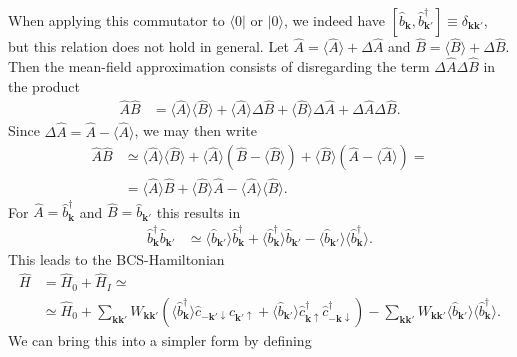 \documentclass[english, parskip=full]{scrartcl}
\renewcommand{\bra}{}
\newcommand{\kla}{}
\newcommand{\Bra}{}
\newcommand{\Ket}{}
\begin{document}
When applying this commutator to $\Bra\langle 0 |$ or $\Ket | 0 \rangle$, we indeed have $\left[ \hat{b}_{\mathbf{k}}, \hat{b}_{\mathbf{k}'}^\dagger \right] \equiv  \delta_{\mathbf{k}\mathbf{k}'}$, but this relation does not hold in general.
Let $\hat{A} = \bra\langle \hat{A} \rangle + \Delta\hat{A}$ and $\hat{B} = \bra\langle \hat{B} \rangle + \Delta\hat{B}$. 
Then the mean-field approximation consists of disregarding the term $\Delta\hat{A}\Delta\hat{B}$ in the product
\begin{align}
\hat{A}\hat{B} &= \bra\langle \hat{A} \rangle\bra\langle \hat{B} \rangle + \bra\langle \hat{A} \rangle\Delta\hat{B} + \bra\langle \hat{B} \rangle\Delta\hat{A} + \Delta\hat{A}\Delta\hat{B}.
\end{align}
Since $\Delta\hat{A} = \hat{A} - \bra\langle \hat{A} \rangle$, we may then write
\begin{align}
\hat{A}\hat{B} &\simeq \bra\langle \hat{A} \rangle\bra\langle \hat{B} \rangle + \bra\langle \hat{A} \rangle \kla\left( \hat{B} - \bra\langle \hat{B} \rangle \right) + \bra\langle \hat{B} \rangle\kla\left( \hat{A} - \bra\langle \hat{A} \rangle \right) = \\
&= \bra\langle \hat{A} \rangle\hat{B} + \bra\langle \hat{B} \rangle\hat{A} - \bra\langle \hat{A} \rangle\bra\langle \hat{B} \rangle.
\end{align}
For $\hat{A} = \hat{b}_{\mathbf{k}}^\dagger$ and $\hat{B} = \hat{b}_{\mathbf{k}'}$ this results in
\begin{align}
\hat{b}_{\mathbf{k}}^\dagger \hat{b}_{\mathbf{k}'} &\simeq \bra\langle \hat{b}_{\mathbf{k}'} \rangle\hat{b}_{\mathbf{k}}^\dagger + \bra\langle \hat{b}_{\mathbf{k}}^\dagger \rangle\hat{b}_{\mathbf{k}'} - \bra\langle \hat{b}_{\mathbf{k}'} \rangle\bra\langle \hat{b}_{\mathbf{k}}^\dagger \rangle.
\end{align}
This leads to the BCS-Hamiltonian
\begin{align}
\hat{H} &= \hat{H}_0 + \hat{H}_I \simeq \\
&\simeq \hat{H}_0 + \sum_{\mathbf{k}\mathbf{k}'} W_{\mathbf{k}\mathbf{k}'} \kla\left( \bra\langle \hat{b}_{\mathbf{k}}^\dagger \rangle\hat{c}_{-\mathbf{k}'\downarrow}\hat{c}_{\mathbf{k}'\uparrow} + \bra\langle \hat{b}_{\mathbf{k}'} \rangle \hat{c}_{\mathbf{k}\uparrow}^\dagger \hat{c}_{-\mathbf{k}\downarrow}^\dagger \right) - \sum_{\textbf{k}\textbf{k}'} W_{\textbf{k}\textbf{k}'} \bra\langle \hat{b}_{\mathbf{k}'} \rangle\bra\langle \hat{b}_{\mathbf{k}}^\dagger \rangle.
\end{align}
We can bring this into a simpler form by defining 
\end{document}
